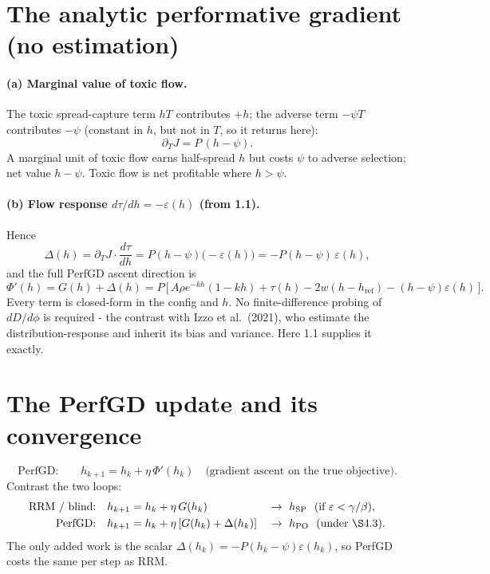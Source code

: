 \documentclass[11pt]{article}
\newcommand{\eps}{\varepsilon}
\newcommand{\href}{h_{\mathrm{ref}}}
\newcommand{\hSP}{h_{\mathrm{SP}}}
\newcommand{\hPO}{h_{\mathrm{PO}}}
\begin{document}
\section{The analytic performative gradient (no estimation)}

\paragraph{(a) Marginal value of toxic flow.}
The toxic spread-capture term $hT$ contributes $+h$; the adverse term $-\psi T$
contributes $-\psi$ (constant in $h$, but not in $T$, so it returns here):
%
\begin{equation*}
  \partial_T J = P\,(h-\psi).
\end{equation*}
%
A marginal unit of toxic flow earns half-spread $h$ but costs $\psi$ to adverse
selection; net value $h-\psi$. Toxic flow is net profitable where $h>\psi$.

\paragraph{(b) Flow response $d\tau/dh=-\eps(h)$ (from 1.1).}
Hence
%
\begin{equation}\label{eq:Delta}
  \Delta(h) = \partial_T J\cdot\frac{d\tau}{dh}
  = P(h-\psi)\big(-\eps(h)\big) = -P(h-\psi)\,\eps(h),
\end{equation}
%
and the full PerfGD ascent direction is
%
\begin{equation}\label{eq:perfgrad}
  \Phi'(h) = G(h)+\Delta(h)
  = P\,\big[\, A\rho e^{-kh}(1-kh) + \tau(h) - 2w(h-\href) - (h-\psi)\eps(h) \,\big].
\end{equation}
%
Every term is closed-form in the config and $h$. No finite-difference probing of
$dD/d\phi$ is required - the contrast with Izzo et al.\ (2021), who estimate the
distribution-response and inherit its bias and variance. Here 1.1 supplies it
exactly.

\section{The PerfGD update and its convergence}

\begin{equation}\label{eq:update}
  \text{PerfGD:}\qquad h_{k+1} = h_k + \eta\,\Phi'(h_k)
  \quad\text{(gradient ascent on the true objective).}
\end{equation}
%
Contrast the two loops:
%
\begin{align*}
  \text{RRM / blind:}\quad & h_{k+1}=h_k+\eta\,G(h_k) && \to\ \hSP \ \ (\text{if } \eps<\gamma/\beta),\\
  \text{PerfGD:}\quad & h_{k+1}=h_k+\eta\,[G(h_k)+\Delta(h_k)] && \to\ \hPO \ \ (\text{under \S4.3}).
\end{align*}
%
The only added work is the scalar $\Delta(h_k)=-P(h_k-\psi)\eps(h_k)$, so PerfGD
costs the same per step as RRM.
\end{document}
